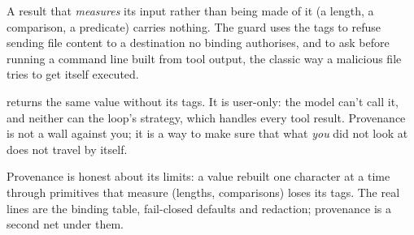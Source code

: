 A result that \emph{measures} its input rather than being made of it (a
length, a comparison, a predicate) carries nothing. The guard uses the tags
to refuse sending file content to a destination no binding authorises, and
to ask before running a command line built from tool output, the classic
way a malicious file tries to get itself executed.

 returns the same value without its tags. It is user-only: the
model can't call it, and neither can the loop's strategy, which handles
every tool result. Provenance is not a wall against you; it is a way to
make sure that what \emph{you} did not look at does not travel by itself.

\begin{careful}
Provenance is honest about its limits: a value rebuilt one character at a
time through primitives that measure (lengths, comparisons) loses its
tags. The real lines are the binding table, fail-closed defaults and
redaction; provenance is a second net under them.
\end{careful}
